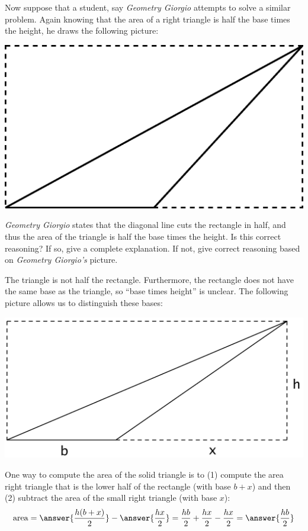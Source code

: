 \documentclass[nooutcomes]{ximera}
\begin{document}
\begin{problem}
Now suppose that a student, say \textit{Geometry Giorgio} attempts to
solve a similar problem. Again knowing that the area of a right
triangle is half the base times the height, he draws the following
picture:
\begin{image}
\includegraphics{pbpDisTriGio.png}
\end{image}
\textit{Geometry Giorgio} states that the diagonal line cuts the
rectangle in half, and thus the area of the triangle is half the base
times the height. Is this correct reasoning? If so, give a complete
explanation. If not, give correct reasoning based on \textit{Geometry
  Giorgio's} picture.
\begin{freeResponse}
\begin{hint}
The triangle is not half the rectangle.  Furthermore, the rectangle does not have the same base as the triangle, so ``base times height'' is unclear.  The following picture allows us to distinguish these bases:  
\begin{image}
\includegraphics{triangleArea.png}
\end{image}
One way to compute the area of the solid triangle is to (1) compute the area right triangle that is the lower half of the rectangle (with base $b+x$) and then (2) subtract the area of the small right triangle (with base $x$): 
\[
\mathrm{area} =  \answer{\frac{h(b+x)}{2}} - \answer{\frac{hx}{2}}= \frac{hb}{2} + \frac{hx}{2} - \frac{hx}{2} = \answer{\frac{hb}{2}}
\]
\end{hint}
\end{freeResponse}
\end{problem}
\end{document}
